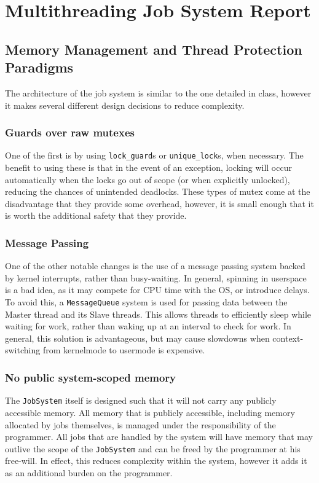 \documentclass{article}
\begin{document}
\section*{Multithreading Job System Report}
	\subsection{Memory Management and Thread Protection Paradigms}
	The architecture of the job system is similar to the one detailed in class, however it makes several different design decisions to reduce complexity.
		\subsubsection{Guards over raw mutexes}
		One of the first is by using \texttt{lock\_guard}s or \texttt{unique\_lock}s, when necessary. The benefit to using these is that in the event of an exception, locking will occur automatically when the locks go out of scope (or when explicitly unlocked), reducing the chances of unintended deadlocks. These types of mutex come at the disadvantage that they provide some overhead, however, it is small enough that it is worth the additional safety that they provide.
		\subsubsection{Message Passing}
			One of the other notable changes is the use of a message passing system backed by kernel interrupts, rather than busy-waiting. In general, spinning in userspace is a bad idea, as it may compete for CPU time with the OS, or introduce delays. To avoid this, a \texttt{MessageQueue} system is used for passing data between the Master thread and its Slave threads. This allows threads to efficiently sleep while waiting for work, rather than waking up at an interval to check for work. In general, this solution is advantageous, but may cause slowdowns when context-switching from kernelmode to usermode is expensive.
		\subsubsection{No public system-scoped memory}
			The \texttt{JobSystem} itself is designed such that it will not carry any publicly accessible memory. All memory that is publicly accessible, including memory allocated by jobs themselves, is managed under the responsibility of the programmer. All jobs that are handled by the system will have memory that may outlive the scope of the \texttt{JobSystem} and can be freed by the programmer at his free-will. In effect, this reduces complexity within the system, however it adds it as an additional burden on the programmer.
\end{document}
